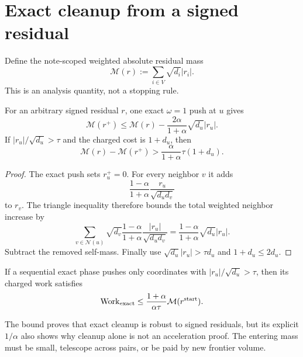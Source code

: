 \section{Exact cleanup from a signed residual}
\label{sec:cleanup}

Define the note-scoped weighted absolute residual mass
\begin{equation}
 \mathcal M(r):=\sum_{i\in V}\sqrt{d_i}|r_i|.
 \label{eq:weighted-residual-mass}
\end{equation}
This is an analysis quantity, not a stopping rule.

\begin{lemma}
\label{lem:exact-mass}
For an arbitrary signed residual $r$, one exact $\omega=1$ push at $u$ gives
\begin{equation}
 \mathcal M(r^+)
 \leq\mathcal M(r)
 -\frac{2\alpha}{1+\alpha}\sqrt{d_u}|r_u|.
 \label{eq:exact-mass-drop}
\end{equation}
If $|r_u|/\sqrt{d_u}>\tau$ and the charged cost is $1+d_u$, then
\begin{equation}
 \mathcal M(r)-\mathcal M(r^+)
 >\frac{\alpha}{1+\alpha}\tau(1+d_u).
 \label{eq:exact-charge-drop}
\end{equation}
\end{lemma}

\begin{proof}
The exact push sets $r_u^+=0$.  For every neighbor $v$ it adds
\[
 \frac{1-\alpha}{1+\alpha}
 \frac{r_u}{\sqrt{d_ud_v}}
\]
to $r_v$.  The triangle inequality therefore bounds the total weighted
neighbor increase by
\[
 \sum_{v\in\mathcal N(u)}\sqrt{d_v}
 \frac{1-\alpha}{1+\alpha}
 \frac{|r_u|}{\sqrt{d_ud_v}}
 =\frac{1-\alpha}{1+\alpha}\sqrt{d_u}|r_u|.
\]
Subtract the removed self-mass.  Finally use
$\sqrt{d_u}|r_u|>\tau d_u$ and $1+d_u\leq2d_u$.
\end{proof}

\begin{corollary}
\label{cor:exact-cleanup-work}
If a sequential exact phase pushes only coordinates with
$|r_u|/\sqrt{d_u}>\tau$, then its charged work satisfies
\begin{equation}
 \operatorname{Work}_{\rm exact}
 \leq\frac{1+\alpha}{\alpha\tau}\mathcal M(r^{\rm start}).
 \label{eq:exact-cleanup-work}
\end{equation}
\end{corollary}

The bound proves that exact cleanup is robust to signed residuals, but its
explicit $1/\alpha$ also shows why cleanup alone is not an acceleration
proof.  The entering mass must be small, telescope across pairs, or be paid by
new frontier volume.
